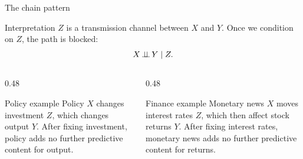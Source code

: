 \documentclass[dvipsnames,aspectratio=169,handout]{beamer}
\begin{document}
\begin{frame}{The chain pattern}
\begin{center}
\end{center}

\begin{alertblock}{Interpretation}
$Z$ is a transmission channel between $X$ and $Y$.
Once we condition on $Z$, the path is blocked:
\[
X\mbox{\,$\perp\!\!\!\perp$\,} Y\mid Z.
\]
\end{alertblock}
\begin{columns}[T]
\begin{column}{0.48\textwidth}
\begin{block}{Policy example}
Policy $X$ changes investment $Z$, which changes output $Y$.
After fixing investment, policy adds no further predictive content for output.
\end{block}
\end{column}
\begin{column}{0.48\textwidth}
\begin{block}{Finance example}
Monetary news $X$ moves interest rates $Z$, which then affect stock returns $Y$.
After fixing interest rates, monetary news adds no further predictive content for returns.
\end{block}
\end{column}
\end{columns}
\end{frame}
\end{document}
